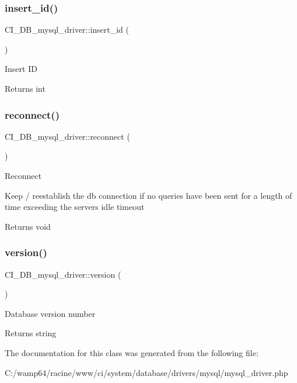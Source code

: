 \subsubsection{\texorpdfstring{insert\+\_\+id()}{insert\_id()}}
{\footnotesize\ttfamily C\+I\+\_\+\+D\+B\+\_\+mysql\+\_\+driver\+::insert\+\_\+id (\begin{DoxyParamCaption}{ }\end{DoxyParamCaption})}

Insert ID

\begin{DoxyReturn}{Returns}
int 
\end{DoxyReturn}
\mbox{\label{class_c_i___d_b__mysql__driver_a62856c8b8569fb9c79ae6c14a6e7c05f}} 
\subsubsection{\texorpdfstring{reconnect()}{reconnect()}}
{\footnotesize\ttfamily C\+I\+\_\+\+D\+B\+\_\+mysql\+\_\+driver\+::reconnect (\begin{DoxyParamCaption}{ }\end{DoxyParamCaption})}

Reconnect

Keep / reestablish the db connection if no queries have been sent for a length of time exceeding the server\textquotesingle{}s idle timeout

\begin{DoxyReturn}{Returns}
void 
\end{DoxyReturn}
\mbox{\label{class_c_i___d_b__mysql__driver_aa383231e6810b0779e02a1fbf09ebc93}} 
\subsubsection{\texorpdfstring{version()}{version()}}
{\footnotesize\ttfamily C\+I\+\_\+\+D\+B\+\_\+mysql\+\_\+driver\+::version (\begin{DoxyParamCaption}{ }\end{DoxyParamCaption})}

Database version number

\begin{DoxyReturn}{Returns}
string 
\end{DoxyReturn}


The documentation for this class was generated from the following file\+:\begin{DoxyCompactItemize}
\item 
C\+:/wamp64/racine/www/ci/system/database/drivers/mysql/mysql\+\_\+driver.\+php\end{DoxyCompactItemize}
